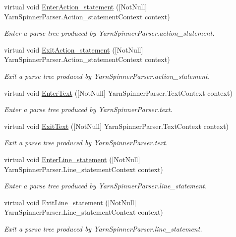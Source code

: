 \begin{DoxyCompactItemize}
virtual void \hyperlink{a00196_ac4e5829f87772c872d57dfd30e4f0450}{Enter\-Action\-\_\-statement} (\mbox{[}Not\-Null\mbox{]} Yarn\-Spinner\-Parser.\-Action\-\_\-statement\-Context context)
\begin{DoxyCompactList}\small\item\em Enter a parse tree produced by Yarn\-Spinner\-Parser.\-action\-\_\-statement. \end{DoxyCompactList}\item 
virtual void \hyperlink{a00196_ad2dccfeea09bb2b5cdcd244833b9f584}{Exit\-Action\-\_\-statement} (\mbox{[}Not\-Null\mbox{]} Yarn\-Spinner\-Parser.\-Action\-\_\-statement\-Context context)
\begin{DoxyCompactList}\small\item\em Exit a parse tree produced by Yarn\-Spinner\-Parser.\-action\-\_\-statement. \end{DoxyCompactList}\item 
virtual void \hyperlink{a00196_acc7ee2d7db98a4fb7401ceef15333752}{Enter\-Text} (\mbox{[}Not\-Null\mbox{]} Yarn\-Spinner\-Parser.\-Text\-Context context)
\begin{DoxyCompactList}\small\item\em Enter a parse tree produced by Yarn\-Spinner\-Parser.\-text. \end{DoxyCompactList}\item 
virtual void \hyperlink{a00196_a8d4b310bdc6b8f2d48c6885ca52e35d2}{Exit\-Text} (\mbox{[}Not\-Null\mbox{]} Yarn\-Spinner\-Parser.\-Text\-Context context)
\begin{DoxyCompactList}\small\item\em Exit a parse tree produced by Yarn\-Spinner\-Parser.\-text. \end{DoxyCompactList}\item 
virtual void \hyperlink{a00196_af47d3ec045f331f2f6eb172e3954d504}{Enter\-Line\-\_\-statement} (\mbox{[}Not\-Null\mbox{]} Yarn\-Spinner\-Parser.\-Line\-\_\-statement\-Context context)
\begin{DoxyCompactList}\small\item\em Enter a parse tree produced by Yarn\-Spinner\-Parser.\-line\-\_\-statement. \end{DoxyCompactList}\item 
virtual void \hyperlink{a00196_adb3ac6b0a7f40d2f4cf5fcfe84b83eb3}{Exit\-Line\-\_\-statement} (\mbox{[}Not\-Null\mbox{]} Yarn\-Spinner\-Parser.\-Line\-\_\-statement\-Context context)
\begin{DoxyCompactList}\small\item\em Exit a parse tree produced by Yarn\-Spinner\-Parser.\-line\-\_\-statement. \end{DoxyCompactList}\item 

\end{DoxyCompactItemize}
